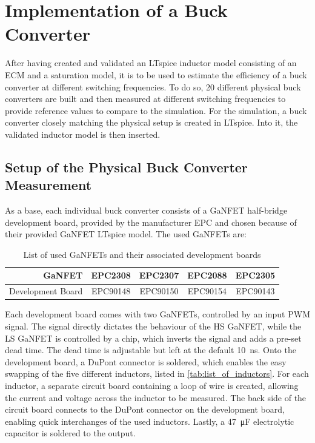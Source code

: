 \chapter{Implementation of a Buck Converter} \label{sec:cha5}
After having created and validated an LTspice inductor model consisting of an \ac{ECM} and a saturation model, it is to be used to estimate the efficiency of a buck converter at different switching frequencies. To do so, 20 different physical buck converters are built and then measured at different switching frequencies to provide reference values to compare to the simulation. For the simulation, a buck converter closely matching the physical setup is created in LTspice. Into it, the validated inductor model is then inserted. 

\section{Setup of the Physical Buck Converter Measurement}\label{sec:setup_of_the_physical_buck_converter_measurement}
As a base, each individual buck converter consists of a \ac{GaNFET} half-bridge development board, provided by the manufacturer EPC and chosen because of their provided \ac{GaNFET} LTspice model. The used \acp{GaNFET} are:
\begin{table}[H]
    \centering
    \caption{List of used \acp{GaNFET} and  their associated development boards}
    \begin{tabular}{|r|c|c|c|c|}
        \hline
        \ac{GaNFET} & EPC2308 & EPC2307 & EPC2088 & EPC2305 \\
        \hline
        Development Board & EPC90148 & EPC90150 & EPC90154 & EPC90143\\
        \hline
    \end{tabular}
    \label{tab:list_of_GaNFETs}
\end{table}
Each development board comes with two \acp{GaNFET}, controlled by an input \ac{PWM} signal. The signal directly dictates the behaviour of the \ac{HS} \ac{GaNFET}, while the \ac{LS} \ac{GaNFET} is controlled by a chip, which inverts the signal and adds a pre-set dead time. The dead time is adjustable but left at the default \SI{10}{\nano\s}. Onto the development board, a DuPont connector is soldered, which enables the easy swapping of the five different inductors, listed in \ref{tab:list_of_inductors}. For each inductor, a separate circuit board containing a loop of wire is created, allowing the current and voltage across the inductor to be measured. The back side of the circuit board connects to the DuPont connector on the development board, enabling quick interchanges of the used inductors. Lastly, a \SI{47}{\micro\F} electrolytic capacitor is soldered to the output.\\\\
